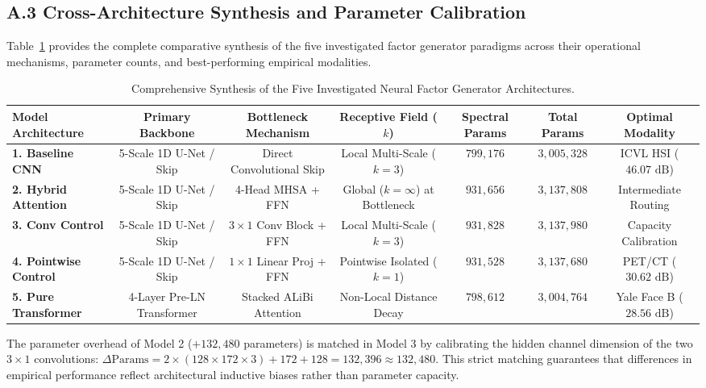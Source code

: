 \subsection*{A.3 Cross-Architecture Synthesis and Parameter Calibration}
Table~\ref{tab:architecture_synthesis_appendix} provides the complete comparative synthesis of the five investigated factor generator paradigms across their operational mechanisms, parameter counts, and best-performing empirical modalities.

\begin{table}[htbp]
\centering
\caption{Comprehensive Synthesis of the Five Investigated Neural Factor Generator Architectures.}
\label{tab:architecture_synthesis_appendix}
\begin{adjustbox}{width=\textwidth}
\begin{tabular}{lcccccc}
\toprule
\textbf{Model Architecture} & \textbf{Primary Backbone} & \textbf{Bottleneck Mechanism} & \textbf{Receptive Field ($k$)} & \textbf{Spectral Params} & \textbf{Total Params} & \textbf{Optimal Modality} \\
\midrule
\textbf{1. Baseline CNN} & 5-Scale 1D U-Net / Skip & Direct Convolutional Skip & Local Multi-Scale ($k=3$) & $799,176$ & $3,005,328$ & ICVL HSI ($46.07\text{ dB}$) \\
\textbf{2. Hybrid Attention} & 5-Scale 1D U-Net / Skip & 4-Head MHSA + FFN & Global ($k=\infty$) at Bottleneck & $931,656$ & $3,137,808$ & Intermediate Routing \\
\textbf{3. Conv Control} & 5-Scale 1D U-Net / Skip & $3 \times 1$ Conv Block + FFN & Local Multi-Scale ($k=3$) & $931,828$ & $3,137,980$ & Capacity Calibration \\
\textbf{4. Pointwise Control} & 5-Scale 1D U-Net / Skip & $1 \times 1$ Linear Proj + FFN & Pointwise Isolated ($k=1$) & $931,528$ & $3,137,680$ & PET/CT ($30.62\text{ dB}$) \\
\textbf{5. Pure Transformer} & 4-Layer Pre-LN Transformer & Stacked ALiBi Attention & Non-Local Distance Decay & $798,612$ & $3,004,764$ & Yale Face B ($28.56\text{ dB}$) \\
\bottomrule
\end{tabular}
\end{adjustbox}
\end{table}

The parameter overhead of Model 2 ($+132,480$ parameters) is matched in Model 3 by calibrating the hidden channel dimension of the two $3 \times 1$ convolutions: $\Delta \text{Params} = 2 \times (128 \times 172 \times 3) + 172 + 128 = 132,396 \approx 132,480$. This strict matching guarantees that differences in empirical performance reflect architectural inductive biases rather than parameter capacity.

